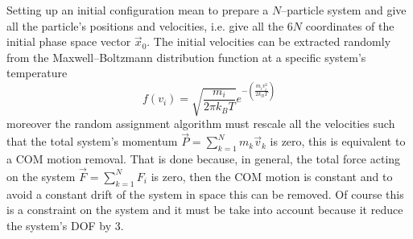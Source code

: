 Setting up an initial configuration mean to prepare a $N$--particle system and give all the particle's positions and velocities, i.e. give all the $6N$ coordinates of the initial phase space vector $\vec x_0$. The initial velocities can be extracted randomly from the Maxwell--Boltzmann distribution function at a specific system's temperature
\begin{equation*}
	f(v_i) = \sqrt{\frac{m_i}{2\pi k_B T}}e^{-\left ( \frac{m_iv_i^2}{2k_B T}\right )}
\end{equation*}
moreover the random assignment algorithm must rescale all the velocities such that the total system's momentum $\vec P = \sum_{k=1}^N m_k\vec v_k$ is zero, this is equivalent to a \ac{COM} motion removal. That is done because, in general, the total force acting on the system $\vec F = \sum_{k=1}^N F_i$ is zero, then the \ac{COM} motion is constant and to avoid a constant drift of the system in space this can be removed. Of course this is a constraint on the system and it must be take into account because it reduce the system's \ac{DOF} by $3$.

